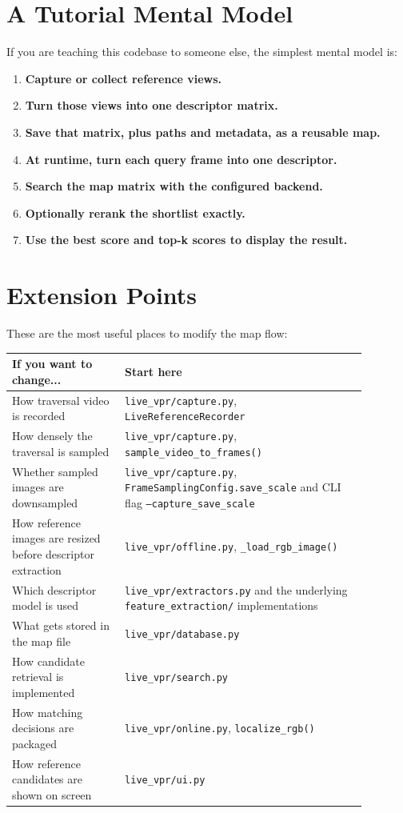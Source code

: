 \documentclass[11pt]{article}
\newcommand{\file}[1]{\texttt{#1}}
\newcommand{\code}[1]{\texttt{#1}}
\begin{document}
\section{A Tutorial Mental Model}
If you are teaching this codebase to someone else, the simplest mental model is:

\begin{enumerate}[leftmargin=*]
  \item \textbf{Capture or collect reference views.}
  \item \textbf{Turn those views into one descriptor matrix.}
  \item \textbf{Save that matrix, plus paths and metadata, as a reusable map.}
  \item \textbf{At runtime, turn each query frame into one descriptor.}
  \item \textbf{Search the map matrix with the configured backend.}
  \item \textbf{Optionally rerank the shortlist exactly.}
  \item \textbf{Use the best score and top-k scores to display the result.}
\end{enumerate}

\section{Extension Points}
These are the most useful places to modify the map flow:

\begin{longtable}{p{0.28\linewidth} p{0.60\linewidth}}
\toprule
\textbf{If you want to change...} & \textbf{Start here} \\
\midrule
How traversal video is recorded & \file{live\_vpr/capture.py}, \code{LiveReferenceRecorder} \\
How densely the traversal is sampled & \file{live\_vpr/capture.py}, \code{sample\_video\_to\_frames()} \\
Whether sampled images are downsampled & \file{live\_vpr/capture.py}, \code{FrameSamplingConfig.save\_scale} and CLI flag \code{--capture\_save\_scale} \\
How reference images are resized before descriptor extraction & \file{live\_vpr/offline.py}, \code{\_load\_rgb\_image()} \\
Which descriptor model is used & \file{live\_vpr/extractors.py} and the underlying \file{feature\_extraction/} implementations \\
What gets stored in the map file & \file{live\_vpr/database.py} \\
How candidate retrieval is implemented & \file{live\_vpr/search.py} \\
How matching decisions are packaged & \file{live\_vpr/online.py}, \code{localize\_rgb()} \\
How reference candidates are shown on screen & \file{live\_vpr/ui.py} \\
\bottomrule
\end{longtable}
\end{document}
